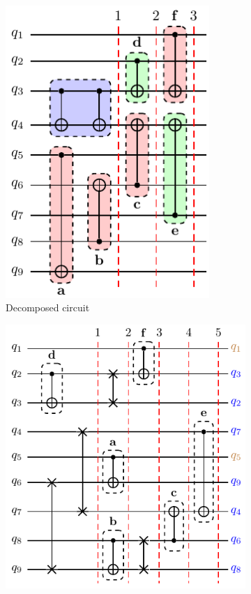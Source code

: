 \documentclass[%
 reprint,
 longbibliography,
 amsmath,amssymb,
 aps,
]{revtex4-2}
\begin{document}
\begin{figure}[t]
\begin{subfigure}[b]{0.30\linewidth}
        \includegraphics[width=0.85\textwidth]{images/sliced_circ.pdf}
        \caption{Decomposed circuit\label{fig:sliced_circ}}
    \end{subfigure}
    \begin{subfigure}[b]{0.33\linewidth}
        \includegraphics[width=\textwidth]{images/transformed_circ.pdf}

\end{subfigure}
\end{figure}
\end{document}
